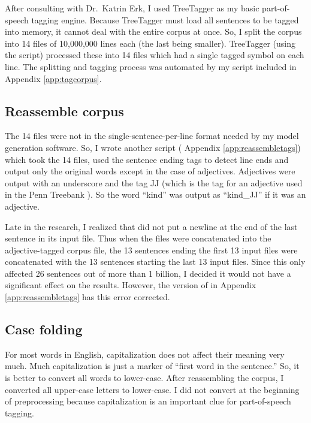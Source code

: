 After consulting with Dr.\ Katrin Erk,  I used TreeTagger  as my basic part-of-speech 
tagging engine. Because TreeTagger must load all sentences to be tagged into 
memory, it cannot deal with the entire corpus at once. So, I split the corpus 
into 14 files of 10,000,000 lines each (the last being smaller). TreeTagger 
(using the  script) processed these into 14 
files which had a single tagged symbol on each line. The splitting and tagging 
process was automated by my  script included in 
Appendix \ref{app:tagcorpus}.

\subsection{Reassemble corpus}

The 14 files were not in the single-sentence-per-line format needed by my model 
generation software. So, I wrote another script ( 
Appendix \ref{app:reassembletags}) which took the 14 files, used the sentence 
ending tags to detect line ends and output only the original words except in the 
case of adjectives. Adjectives were output with an underscore and the tag JJ 
(which is the tag for an adjective used in the Penn Treebank ). So 
the word ``kind'' was output as ``kind\_JJ'' if it was an adjective.

Late in the research, I realized that  did not 
put a newline at the end of the last sentence in its input file. Thus when the 
files were concatenated into the adjective-tagged corpus file, the 13 sentences 
ending the first 13 input files were concatenated with the 13 sentences starting 
the last 13 input files. Since this only affected 26 sentences out of more than 
1 billion, I decided it would not have a significant effect on the results. 
However, the version of  in Appendix 
\ref{app:reassembletags} has this error corrected.

\subsection{Case folding}

For most words in English, capitalization does not affect their meaning very 
much. Much capitalization is just a marker of ``first word in the sentence.'' 
So, it is better to convert all words to lower-case. After reassembling the 
corpus, I converted all upper-case letters to lower-case. I did not convert at 
the beginning of preprocessing because capitalization is an important clue for 
part-of-speech tagging.

